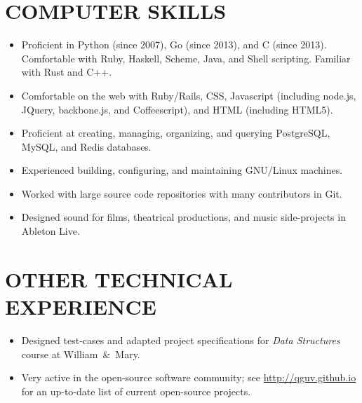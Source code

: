 \documentclass{res}     %
\begin{document}
\begin{resume}

\section{COMPUTER SKILLS}
\vspace{5mm}
\begin{itemize}[leftmargin=5mm]
\item Proficient in Python (since 2007), Go (since 2013), and C (since 2013). Comfortable with Ruby, Haskell, Scheme, Java, and Shell scripting. Familiar with Rust and C++.
\item Comfortable on the web with Ruby/Rails, CSS, Javascript (including node.js, JQuery, backbone.js, and Coffeescript), and HTML (including HTML5).
\item Proficient at creating, managing, organizing, and querying PostgreSQL, MySQL, and Redis databases.
\item Experienced building, configuring, and maintaining GNU/Linux machines.
\item Worked with large source code repositories with many contributors in Git.
\item Designed sound for films, theatrical productions, and music side-projects in Ableton Live.
\end{itemize}
 
\section{OTHER TECHNICAL EXPERIENCE}
\vspace{5mm}
\begin{itemize}[leftmargin=5mm]
\item Designed test-cases and adapted project specifications for \emph{Data Structures} course at William~\&~Mary.
\item Very active in the open-source software community; see \url{http://qguv.github.io} for an up-to-date list of current open-source projects.
\end{itemize}


\end{resume}
\end{document}
